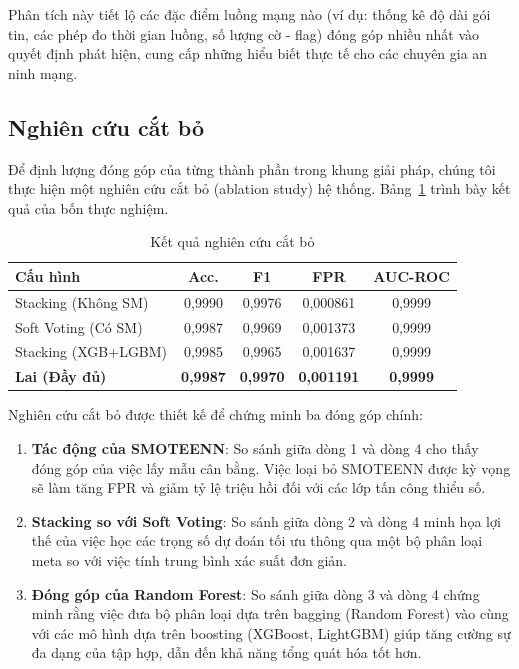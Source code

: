 Phân tích này tiết lộ các đặc điểm luồng mạng nào (ví dụ: thống kê độ dài gói tin, các phép đo thời gian luồng, số lượng cờ - flag) đóng góp nhiều nhất vào quyết định phát hiện, cung cấp những hiểu biết thực tế cho các chuyên gia an ninh mạng.

\subsection{Nghiên cứu cắt bỏ}
Để định lượng đóng góp của từng thành phần trong khung giải pháp, chúng tôi thực hiện một nghiên cứu cắt bỏ (ablation study) hệ thống. Bảng~\ref{tab:ablation} trình bày kết quả của bốn thực nghiệm.

\begin{table}[htbp]
\centering
\caption{Kết quả nghiên cứu cắt bỏ}
\label{tab:ablation}
\begin{tabularx}{\columnwidth}{@{}Xcccc@{}}
\toprule
\textbf{Cấu hình} & \textbf{Acc.} & \textbf{F1} & \textbf{FPR} & \textbf{AUC-ROC} \\
\midrule
Stacking (Không SM)              & 0,9990 & 0,9976 & 0,000861 & 0,9999    \\
Soft Voting (Có SM)              & 0,9987 & 0,9969 & 0,001373 & 0,9999    \\
Stacking (XGB+LGBM)              & 0,9985 & 0,9965 & 0,001637 & 0,9999    \\
\midrule
\textbf{Lai (Đầy đủ)}            & \textbf{0,9987} & \textbf{0,9970} & \textbf{0,001191} & \textbf{0,9999} \\
\bottomrule
\end{tabularx}
\end{table}

Nghiên cứu cắt bỏ được thiết kế để chứng minh ba đóng góp chính:
\begin{enumerate}
    \item \textbf{Tác động của SMOTEENN}: So sánh giữa dòng 1 và dòng 4 cho thấy đóng góp của việc lấy mẫu cân bằng. Việc loại bỏ SMOTEENN được kỳ vọng sẽ làm tăng FPR và giảm tỷ lệ triệu hồi đối với các lớp tấn công thiểu số.
    \item \textbf{Stacking so với Soft Voting}: So sánh giữa dòng 2 và dòng 4 minh họa lợi thế của việc học các trọng số dự đoán tối ưu thông qua một bộ phân loại meta so với việc tính trung bình xác suất đơn giản.
    \item \textbf{Đóng góp của Random Forest}: So sánh giữa dòng 3 và dòng 4 chứng minh rằng việc đưa bộ phân loại dựa trên bagging (Random Forest) vào cùng với các mô hình dựa trên boosting (XGBoost, LightGBM) giúp tăng cường sự đa dạng của tập hợp, dẫn đến khả năng tổng quát hóa tốt hơn.
\end{enumerate}

